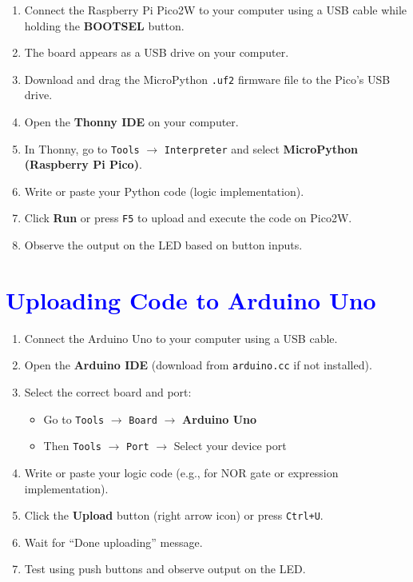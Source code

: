 \documentclass[twocolumn]{article}
\begin{document}
\begin{enumerate}
    \item Connect the Raspberry Pi Pico2W to your computer using a USB cable while holding the \textbf{BOOTSEL} button.
    \item The board appears as a USB drive on your computer.
    \item Download and drag the MicroPython \texttt{.uf2} firmware file to the Pico's USB drive.
    \item Open the \textbf{Thonny IDE} on your computer.
    \item In Thonny, go to \texttt{Tools} $\rightarrow$ \texttt{Interpreter} and select \textbf{MicroPython (Raspberry Pi Pico)}.
    \item Write or paste your Python code (logic implementation).
    \item Click \textbf{Run} or press \texttt{F5} to upload and execute the code on Pico2W.
    \item Observe the output on the LED based on button inputs.
\end{enumerate}

\section*{\textcolor{blue}{Uploading Code to Arduino Uno }}

\begin{enumerate}
    \item Connect the Arduino Uno to your computer using a USB cable.
    \item Open the \textbf{Arduino IDE} (download from \texttt{arduino.cc} if not installed).
    \item Select the correct board and port:
    \begin{itemize}
        \item Go to \texttt{Tools} $\rightarrow$ \texttt{Board} $\rightarrow$ \textbf{Arduino Uno}
        \item Then \texttt{Tools} $\rightarrow$ \texttt{Port} $\rightarrow$ Select your device port
    \end{itemize}
    \item Write or paste your logic code (e.g., for NOR gate or expression implementation).
    \item Click the \textbf{Upload} button (right arrow icon) or press \texttt{Ctrl+U}.
    \item Wait for “Done uploading” message.
    \item Test using push buttons and observe output on the LED.
\end{enumerate}
\vspace{1em}
\end{document}
